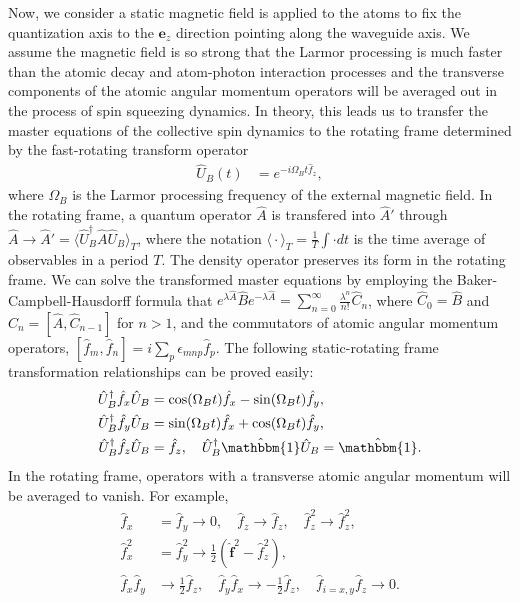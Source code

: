 \documentclass[preprint,aps,pra,onecolumn,superscriptaddress]{revtex4-1} %
\newcommand{\expect}[1]{\big\langle #1 \big\rangle}
\begin{document}
\begin{appendix}
Now, we consider a static magnetic field is applied to the atoms to fix the quantization axis to the $ \mathbf{e}_{z} $ direction pointing along the waveguide axis.
We assume the magnetic field is so strong that the Larmor processing is much faster than the atomic decay and atom-photon interaction processes and the transverse components of the atomic angular momentum operators will be averaged out in the process of spin squeezing dynamics.
In theory, this leads us to transfer the master equations of the collective spin dynamics to the rotating frame determined by the fast-rotating transform operator
\begin{align}
\hat{U}_B(t) &= e^{-i\Omega_Bt\hat{f}_z},
\end{align}
where $ \Omega_B $ is the Larmor processing frequency of the external magnetic field.
In the rotating frame, a quantum operator $ \hat{A} $ is transfered into $ \hat{A}' $ through $ \hat{A}\rightarrow \hat{A}'=\expect{\hat{U}_B^\dagger\hat{A}\hat{U}_B }_T $, where the notation $ \expect{\cdot}_T=\frac{1}{T}\int\cdot dt $ is the time average of observables in a period $ T $.
The density operator preserves its form in the rotating frame.
We can solve the transformed master equations by employing the Baker-Campbell-Hausdorff formula that $ e^{\lambda\hat{A}}\hat{B}e^{-\lambda\hat{A}}=\sum_{n=0}^\infty\frac{\lambda^n}{n!}\hat{C}_n $, where $ \hat{C}_0=\hat{B} $ and $ \hat{C}_n=\left[\hat{A},\hat{C}_{n-1} \right] $ for $ n>1 $, and the commutators of atomic angular momentum operators, $ \left[\hat{f}_m, \hat{f}_n\right]=i\sum_p\epsilon_{mnp}\hat{f}_p $.
The following static-rotating frame transformation relationships can be proved easily:
\begin{subequations}\label{eq:rotationtransf}
	\begin{align}
	\hat{U}_B^\dagger\hat{f}_{x}\hat{U}_B&=\cos(\Omega_Bt)\hat{f}_x-\sin(\Omega_Bt)\hat{f}_y,\\
	\hat{U}_B^\dagger\hat{f}_{y}\hat{U}_B &= \sin(\Omega_Bt)\hat{f}_x+ \cos(\Omega_Bt)\hat{f}_y, \\ \hat{U}_B^\dagger\hat{f}_{z}\hat{U}_B &=\hat{f}_z,\quad \hat{U}_B^\dagger\hat{\mathbbm{1}}\hat{U}_B =\hat{\mathbbm{1}}.
	\end{align}
\end{subequations}
In the rotating frame, operators with a transverse atomic angular momentum will be averaged to vanish. For example,
\begin{subequations}\label{eq:rotationtransf_f}
	\begin{align}
	\hat{f}_{x}&=\hat{f}_{y} \rightarrow 0, \quad \hat{f}_{z}\rightarrow\hat{f}_z, \quad \hat{f}_{z}^ 2\rightarrow\hat{f}_z^2,\\
	\hat{f}^2_{x} &= \hat{f}^ 2_{y} \rightarrow \frac{1}{2}(\hat{\mathbf{f}}^2-\hat{f}_z^2),\\
	\hat{f}_{x}\hat{f}_{y} &\rightarrow\frac{1}{2}\hat{f}_z,\quad \hat{f}_{y}\hat{f}_{x}\rightarrow -\frac{1}{2}\hat{f}_z,\quad \hat{f}_{i=x,y}\hat{f}_{z}\rightarrow 0.
	\end{align}
\end{subequations}




\end{appendix}
\end{document}
